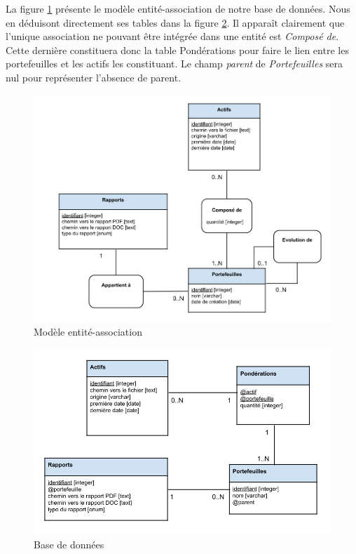 \documentclass[a4paper,titlepage,french]{report}
\begin{document}
La figure \ref{fig:modele-entite-association} présente le modèle entité-association de notre base de données.
Nous en déduisont directement ses tables dans la figure \ref{fig:base-donnees}.
Il apparaît clairement que l'unique association ne pouvant être intégrée dans une entité est \textit{Composé de}.
Cette dernière constituera donc la table Pondérations pour faire le lien entre les portefeuilles et les actifs les constituant.
Le champ \textit{parent} de \textit{Portefeuilles} sera nul pour représenter l'absence de parent.

\begin{figure}
  	\center
  	\includegraphics[width=1\textwidth]{modele-entite-association.png}
  	\caption{Modèle entité-association}
  	\label{fig:modele-entite-association}
\end{figure}

\begin{figure}
  	\center
  	\includegraphics[width=1\textwidth]{base-donnees.png}
  	\caption{Base de données}
  	\label{fig:base-donnees}
\end{figure}
\end{document}
